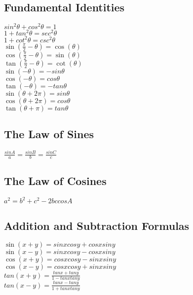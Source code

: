 \documentclass{article}
\begin{document}
	\subsection*{Fundamental Identities}
		\begin{center}
		$sin^2 \theta + cos^2 \theta = 1$\\
		
		$1 + tan^2 \theta = sec^2\theta$\\
		
		$1 + cot^2 \theta = csc^2 \theta$\\
		
		$\sin(\frac{\pi}{2} - \theta) = \cos(\theta)$\\
		
		$\cos(\frac{\pi}{2} - \theta) = \sin(\theta)$\\
		
		$\tan(\frac{\pi}{2} - \theta) = \cot(\theta)$\\
		
		$\sin(-\theta) = -sin\theta$\\
		
		$\cos(-\theta) = cos\theta$\\
		
		$\tan(-\theta) = -tan\theta$\\
		
		$\sin(\theta + 2\pi) = sin\theta$\\
		
		$\cos(\theta + 2\pi) = cos\theta$\\
		
		$\tan(\theta + \pi) = tan\theta$
		\end{center}
	\subsection*{The Law of Sines}
		\begin{center}
		$\frac{sin A}{a} = \frac{sin B}{b} = \frac{sin C}{c}$
		\end{center}
	\subsection*{The Law of Cosines}
		\begin{center}
		$a^2 = b^2 + c^2 - 2bc cos A$
		\end{center}
	\subsection*{Addition and Subtraction Formulas}
		\begin{center}
		$\sin(x + y) = sinxcosy + cosxsiny$\\
		
		$\sin(x - y) = sinxcosy - cosxsiny$\\
		
		$\cos(x + y) = cosxcosy - sinxsiny$\\
		
		$\cos(x - y) = cosxcosy + sinxsiny$\\
		
		$tan(x + y) = \frac{tanx + tany}{1 - tanxtany}$\\
		$tan(x - y) = \frac{tanx - tany}{1 + tanxtany}$
		\end{center}
\end{document}
